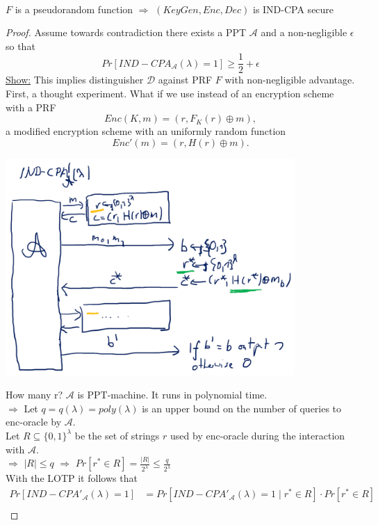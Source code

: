	
	\begin{theorem}\ 
		\begin{center}
			$F$ is a pseudorandom function $\Rightarrow$ $(KeyGen,Enc,Dec)$ is IND-CPA secure
		\end{center}
	\end{theorem}
	\begin{proof}
		Assume towards contradiction there exists a PPT $\mathcal{A}$ and a non-negligible $\epsilon$ so that
		$$Pr[IND-CPA_{\mathcal{A}}(\lambda) = 1] \geq \frac{1}{2} + \epsilon$$
		\underline{Show:}
		This implies distinguisher $\mathcal{D}$ against PRF $F$ with non-negligible advantage.\\
		First, a thought experiment. What if we use instead of an encryption scheme with a PRF
		$$Enc(K,m) = (r, F_K(r) \oplus m),$$
		a modified encryption scheme with an uniformly random function
		$$Enc'(m) = (r, H(r) \oplus m).$$
	    \begin{center}
			\includegraphics[width=110mm]{Graphics/CPA/cpa4.png}
		\end{center}
		How many r? $\mathcal{A}$ is PPT-machine. It runs in polynomial time.\\
		$\Rightarrow$ Let $q=q(\lambda)=poly(\lambda)$ is an upper bound on the number of queries to enc-oracle by $\mathcal{A}$.\\
		Let $R \subseteq \{0,1\}^{\lambda}$ be the set of strings $r$ used by enc-oracle during the interaction with $\mathcal{A}$.\\
		$\Rightarrow$ $|R| \leq q$
		$\Rightarrow$ $Pr[r^* \in R] = \frac{|R|}{2^{\lambda}} \leq \frac{q}{2^{\lambda}}$\\
		With the LOTP it follows that
		\begin{align*}
			Pr[IND-CPA'_{\mathcal{A}}(\lambda) = 1] &= Pr[IND-CPA'_{\mathcal{A}}(\lambda) = 1 \mid r^* \in R] \cdot Pr[r^* \in R]\\

\end{align*}
\end{proof}
